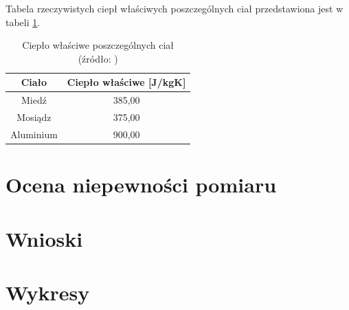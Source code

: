 \documentclass[a4paper,12pt]{article}
\begin{document}
Tabela rzeczywistych ciepł właściwych poszczególnych ciał przedstawiona jest w tabeli \ref{tab:cieplo_wlasciwe_rzeczywiste}.

\begin{table}[H]
    \centering
    \begin{tabular}{|c|c|}
        \hline
        \textbf{Ciało} & \textbf{Ciepło właściwe [J/kgK]} \\
        \hline
        Miedź & 385{,}00 \\
        \hline
        Mosiądz & 375{,}00 \\
        \hline
        Aluminium & 900{,}00 \\
        \hline
    \end{tabular}
    \caption{Ciepło właściwe poszczególnych ciał (źródło: \cite{cieplo_wlasciwe_tabele})}
    \label{tab:cieplo_wlasciwe_rzeczywiste}
\end{table}




\section{Ocena niepewności pomiaru}

\section{Wnioski}


\newpage

\section{Wykresy}
\end{document}
